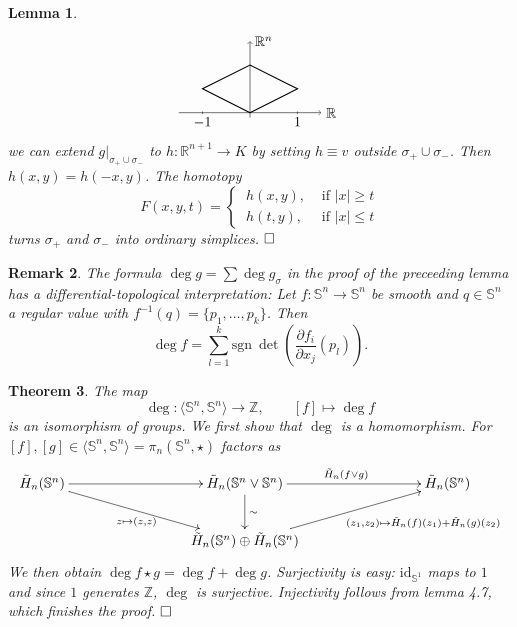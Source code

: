 \documentclass[11pt]{book}
\numberwithin{dummy}{section}
\newtheorem{theorem}{Theorem}[section]
\newtheorem{lemma}[theorem]{Lemma}
\newtheorem{remark}[theorem]{Remark}
\theoremstyle{nonumberbreak}
\newenvironment{pr}[1][]{\ifthenelse{\equal{#1}{}}{\proof}{\proof[#1]}\rm}{\endproof}
\newcommand{\Sph}{\mathbb{S}}
\newcommand{\la}{\longrightarrow}
\newcommand{\id}{\mathrm{id}}
\newcommand{\Z}{\mathbb{Z}}
\begin{document}
\begin{spacing}{1.4}
\begin{lemma}
\begin{pr}
$$
\begin{tikzpicture}[scale=0.6]

\draw[thin,->] (-3,0) -- (3,0);
\draw[thin, ->] (0,-0.2) -- (0,3);
\draw[thick] (0,0) -- (-2,1) -- (0,2) -- (2,1) -- (0,0);
\draw (0,3) node[right] {$\mathbb{R}^n$};
\draw (3,0) node[right] {$\mathbb{R}$};
\draw (2,0) node[below] {$1$};
\draw (-2,0) node[below] {$-1$};
\draw (-2,-0.05) -- (-2,0.05);
\draw (2,-0.05) -- (2,0.05);

\end{tikzpicture}
$$
we can extend $g \vert_{\sigma_+ \cup \sigma_-}$ to $h: \mathbb{R}^{n+1} \la K$ by setting $h\equiv v$ outside $\sigma_+ \cup \sigma_-$. Then $h(x,y) = h(-x,y)$. The homotopy
$$F(x,y,t) = \begin{cases} \ h(x,y), & \textrm{ if } \vert x \vert \geqslant t \\ \ h(t,y), & \textrm{ if } \vert x \vert \leqslant t \end{cases} $$
turns $\sigma_+$ and $\sigma_-$ into ordinary simplices. $\hfill \Box$

\end{pr}


\end{lemma}


\begin{remark}
The formula $\deg g = \sum \deg g_{\sigma}$ in the proof of the preceeding lemma has a differential-topological interpretation: Let $f: \Sph^n \la \Sph^n$ be smooth and $q \in \Sph^n$ a regular value with $f^{-1}(q) = \{p_1, \ldots, p_k\}$. Then 
$$\deg f = \sum_{l=1}^k \mathrm{sgn} \ \det \left( \frac{\partial f_i}{\partial x_j} (p_l) \right).$$

\end{remark}

\begin{theorem}
The map 
$$ \deg: \langle \Sph^n, \Sph^n \rangle \la \Z, \qquad [f]\mapsto \deg f$$
is an isomorphism of groups. 
\begin{pr}
We first show that $\deg$ is a homomorphism. For $[f], [g] \in \langle \Sph^n, \Sph^n\rangle = \pi_n(\Sph^n, \star)$ factors as
$$
\begin{xy}
\xymatrix{
\tilde{H}_n(\Sph^n) \ar[rrr] \ar[rrrd]_{z \mapsto (z,z)} &&& \tilde{H}_n(\Sph^n \vee \Sph^n) \ar[d]^{\sim} \ar[rrr]^{\tilde{H}_n(f \vee g)} &&& \tilde{H}_n(\Sph^n) \\ &&& \tilde{H}_n(\Sph^n) \oplus \tilde{H}_n(\Sph^n) \ar[rrru]_{\qquad \qquad \qquad (z_1, z_2) \mapsto \tilde{H}_n(f)(z_1) + \tilde{H}_n(g)(z_2)} &&&
}
\end{xy}
$$
We then obtain $\deg f \star g = \deg f + \deg g$. Surjectivity is easy: $\id_{\Sph^1}$ maps to $1$ and since $1$ generates $\Z$, $\deg$ is surjective. Injectivity follows from lemma 4.7, which finishes the proof. $\hfill \Box$
\end{pr}


\end{theorem}
\end{spacing}
\end{document}
